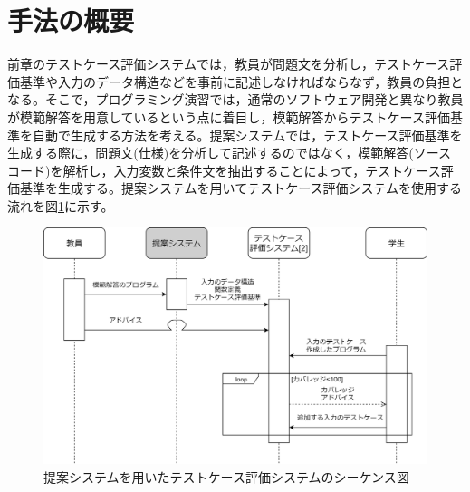 \documentclass{tpu-sotu}
\begin{document}
\section{手法の概要}
前章のテストケース評価システムでは，教員が問題文を分析し，テストケース評価基準や入力のデータ構造などを事前に記述しなければならなず，教員の負担となる。そこで，プログラミング演習では，通常のソフトウェア開発と異なり教員が模範解答を用意しているという点に着目し，模範解答からテストケース評価基準を自動で生成する方法を考える。提案システムでは，テストケース評価基準を生成する際に，問題文(仕様)を分析して記述するのではなく，模範解答(ソースコード)を解析し，入力変数と条件文を抽出することによって，テストケース評価基準を生成する。提案システムを用いてテストケース評価システムを使用する流れを図\ref{c1}に示す。
\begin{figure}[h]
  \centering
  \includegraphics[width=125mm]{シーケンス図2.png}
  \caption{提案システムを用いたテストケース評価システムのシーケンス図}
  \label{c1}
\end{figure}
\end{document}
